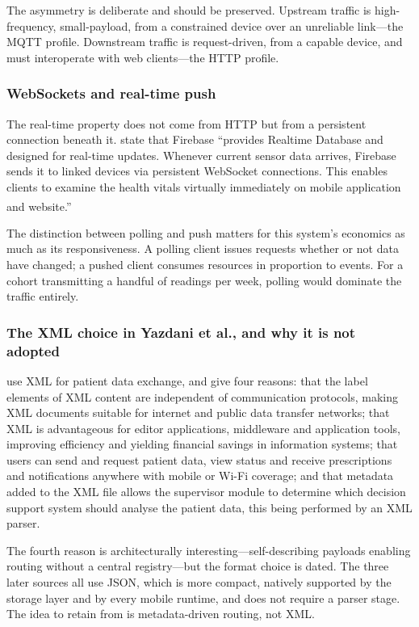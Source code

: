 \documentclass[12pt,a4paper,oneside]{report}
\newcommand{\bq}[1]{``#1''\textsuperscript{\dag}}
\begin{document}
The asymmetry is deliberate and should be preserved. Upstream traffic is high-frequency, small-payload, from a constrained device over an unreliable link---the MQTT profile. Downstream traffic is request-driven, from a capable device, and must interoperate with web clients---the HTTP profile.

\subsubsection{WebSockets and real-time push}

The real-time property does not come from HTTP but from a persistent connection beneath it. \Textcite{efendi2025} state that Firebase \bq{provides Realtime Database and designed for real-time updates. Whenever current sensor data arrives, Firebase sends it to linked devices via persistent WebSocket connections. This enables clients to examine the health vitals virtually immediately on mobile application and website.}

The distinction between polling and push matters for this system's economics as much as its responsiveness. A polling client issues requests whether or not data have changed; a pushed client consumes resources in proportion to events. For a cohort transmitting a handful of readings per week, polling would dominate the traffic entirely.

\subsubsection{The XML choice in Yazdani et al., and why it is not adopted}

\Textcite{yazdani2018} use XML for patient data exchange, and give four reasons: that the label elements of XML content are independent of communication protocols, making XML documents suitable for internet and public data transfer networks; that XML is advantageous for editor applications, middleware and application tools, improving efficiency and yielding financial savings in information systems; that users can send and request patient data, view status and receive prescriptions and notifications anywhere with mobile or Wi-Fi coverage; and that metadata added to the XML file allows the supervisor module to determine which decision support system should analyse the patient data, this being performed by an XML parser.

The fourth reason is architecturally interesting---self-describing payloads enabling routing without a central registry---but the format choice is dated. The three later sources all use JSON, which is more compact, natively supported by the storage layer and by every mobile runtime, and does not require a parser stage. The idea to retain from \textcite{yazdani2018} is metadata-driven routing, not XML.
\end{document}

